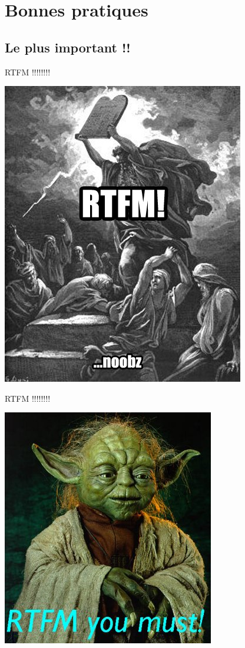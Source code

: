 \documentclass{beamer}
\begin{document}
\section{Bonnes pratiques}
\subsection{Le plus important !!}
\begin{frame}{RTFM !!!!!!!!}
	\begin{center}
		\includegraphics[scale=0.4]{rtfm01.jpg}
	\end{center}
\end{frame}
\begin{frame}{RTFM !!!!!!!!}
	\begin{center}
		\includegraphics[scale=0.5]{rtfm02.jpg}
	\end{center}
\end{frame}
\end{document}
